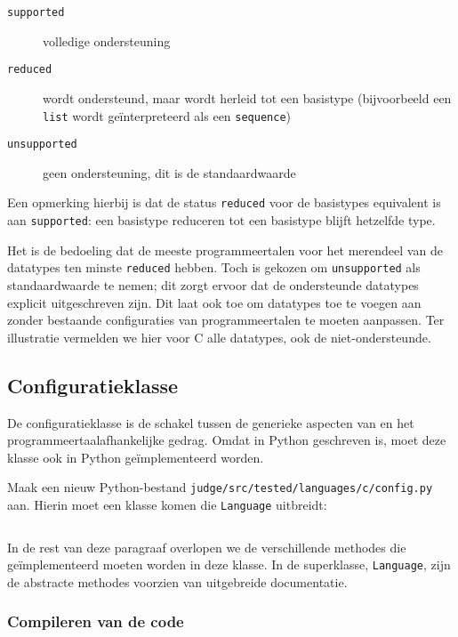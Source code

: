 \begin{description}
    \item[\texttt{supported}] volledige ondersteuning
    \item[\texttt{reduced}] wordt ondersteund, maar wordt herleid tot een basistype (bijvoorbeeld een \texttt{list} wordt geïnterpreteerd als een \texttt{sequence})
    \item[\texttt{unsupported}] geen ondersteuning, dit is de standaardwaarde
\end{description}

Een opmerking hierbij is dat de status \texttt{reduced} voor de basistypes equivalent is aan \texttt{supported}: een basistype reduceren tot een basistype blijft hetzelfde type.

Het is de bedoeling dat de meeste programmeertalen voor het merendeel van de datatypes ten minste \texttt{reduced} hebben.
Toch is gekozen om \texttt{unsupported} als standaardwaarde te nemen;
dit zorgt ervoor dat de ondersteunde datatypes explicit uitgeschreven zijn.
Dit laat ook toe om datatypes toe te voegen aan \tested{} zonder bestaande configuraties van programmeertalen te moeten aanpassen.
Ter illustratie vermelden we hier voor C alle datatypes, ook de niet-ondersteunde.

\subsection{Configuratieklasse}\label{subsec:configuratieklasse}

De configuratieklasse is de schakel tussen de generieke aspecten van \tested{} en het programmeertaalafhankelijke gedrag.
Omdat \tested{} in Python geschreven is, moet deze klasse ook in Python geïmplementeerd worden.

Maak een nieuw Python-bestand \texttt{judge/src/tested/languages/c/config.py} aan.
Hierin moet een klasse komen die \texttt{Language} uitbreidt:

\inputminted[firstline=10,lastline=10]{python}{sources/c-config.py}

In de rest van deze paragraaf overlopen we de verschillende methodes die geïmplementeerd moeten worden in deze klasse.
In de superklasse, \texttt{Language}, zijn de abstracte methodes voorzien van uitgebreide documentatie.

\subsubsection{Compileren van de code}

